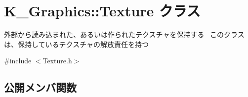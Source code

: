 \hypertarget{class_k___graphics_1_1_texture}{}\section{K\+\_\+\+Graphics\+:\+:Texture クラス}
\label{class_k___graphics_1_1_texture}


外部から読み込まれた、あるいは作られたテクスチャを保持する~\newline
このクラスは、保持しているテクスチャの解放責任を持つ  




{\ttfamily \#include $<$Texture.\+h$>$}

\subsection*{公開メンバ関数}

